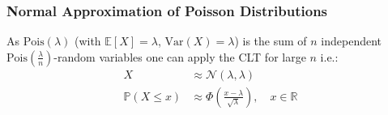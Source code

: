 \subsubsection{Normal Approximation of Poisson Distributions}\label{norm_approx_poiss}
As $\mathrm{Pois}(\lambda)$ (with $\mathbb{E}[X]=\lambda$, $\mathrm{Var}(X)=\lambda$) is the sum of $n$ independent $\mathrm{Pois}(\frac{\lambda}{n})$-random variables one can apply the CLT for large $n$ i.e.:
\begin{align*}
    X                   & \approx\mathcal{N}(\lambda, \lambda)                                          \\
    \mathbb{P}(X\leq x) & \approx\Phi\left(\frac{x-\lambda}{\sqrt{\lambda}}\right),\quad x\in\mathbb{R}
\end{align*}